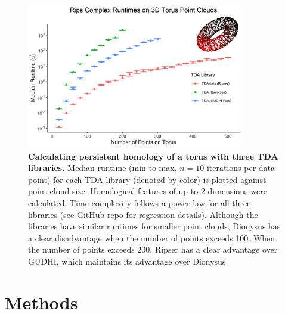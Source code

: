 \begin{figure}[tb]
  \centering
  \includegraphics[height=2.5in]{fig3.png}
  \caption{
    \textbf{Calculating persistent homology of a torus with three TDA libraries.}
    Median runtime (min to max, $n=10$ iterations per data point) for each TDA library (denoted by color) is plotted against point cloud size.
    Homological features of up to 2 dimensions were calculated.
    Time complexity follows a power law for all three libraries (see GitHub repo for regression details).
    Although the libraries have similar runtimes for smaller point clouds, Dionysus has a clear disadvantage when the number of points exceeds 100.
    When the number of points exceeds 200, Ripser has a clear advantage over GUDHI, which maintains its advantage over Dionysus.
  }
\label{fig:tor}
\end{figure}

\hypertarget{methods}{%
\section{Methods}\label{methods}}

